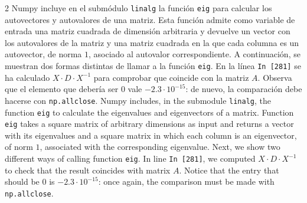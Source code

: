 \begin{paracol}{2}
Numpy incluye en el submódulo \texttt{linalg} la función \texttt{eig} para calcular los autovectores y autovalores de una matriz. Esta función admite como variable de entrada una matriz cuadrada de dimensión arbitraria y devuelve un vector con los autovalores de la matriz y una matriz cuadrada en la que cada columna es un autovector, de norma $1$, asociado al autovalor correspondiente. A continuación, se muestran dos formas distintas de llamar a la función \texttt{eig}. En la línea \texttt{In [281]} se ha calculado $X\cdot D \cdot X^{-1}$ para comprobar que coincide con la matriz $A$. Observa que el elemento que debería ser $0$ vale $-2.3\cdot 10^{-15}$: de nuevo, la comparación debe hacerse con \texttt{np.allclose}.
\switchcolumn
Numpy includes, in the submodule \texttt{linalg}, the function \texttt{eig} to calculate the eigenvalues and eigenvectors of a matrix. Function \texttt{eig} takes a square matrix of arbitrary dimensions as input and returns a vector with its eigenvalues and a square matrix in which each column is an eigenvector, of norm $1$, associated with the corresponding eigenvalue. Next, we show two different ways of calling function \texttt{eig}. In line \texttt{In [281]}, we computed $X\cdot D \cdot X^{-1}$ to check that the result coincides with matrix $A$. Notice that the entry that should be $0$ is $-2.3\cdot 10^{-15}$: once again, the comparison must be made with \texttt{np.allclose}.
\end{paracol}

